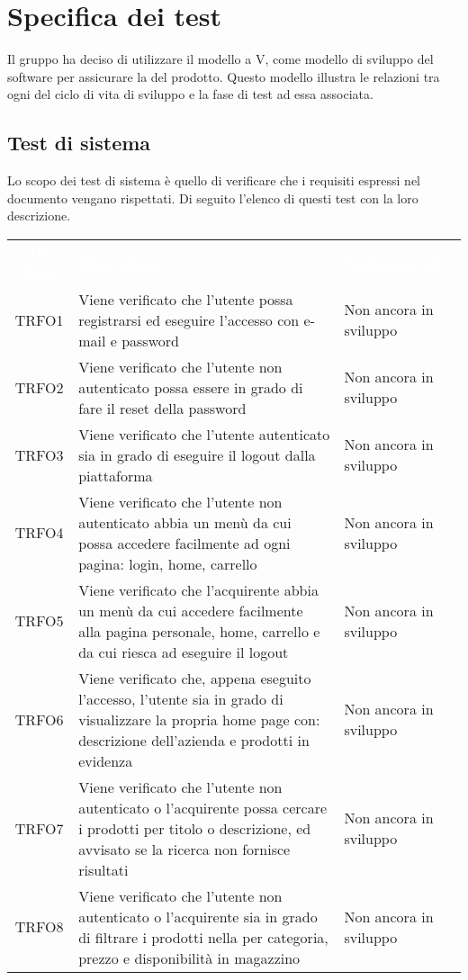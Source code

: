 \section{Specifica dei test}
\label{specificatest}
Il gruppo ha deciso di utilizzare il modello a V, come modello di sviluppo del software per assicurare la  del prodotto. Questo modello illustra le relazioni tra ogni  del ciclo di vita di sviluppo e la fase di test ad essa associata.
\subsection{Test di sistema}
Lo scopo dei test di sistema è quello di verificare che i requisiti espressi nel documento \AdR{} vengano rispettati. Di seguito l'elenco di questi test con la loro descrizione.
\begin{longtable}{|c| C{10cm} |C{3cm}|} 
	\textcolor{white}{\textbf{ID Test}}&
	\textcolor{white}{\textbf{Descrizione}}&
	\textcolor{white}{\textbf{Implementato}}\\
	TRFO1 & Viene verificato che l'utente possa registrarsi ed eseguire l'accesso con e-mail e password & Non ancora in sviluppo\\ \hline
	TRFO2 & Viene verificato che l'utente non autenticato possa essere in grado di fare il reset della password & Non ancora in sviluppo\\ \hline
	TRFO3 & Viene verificato che l'utente autenticato sia in grado di eseguire il logout dalla piattaforma & Non ancora in sviluppo\\ \hline
	TRFO4 & Viene verificato che l'utente non autenticato abbia un menù da cui possa accedere facilmente ad ogni pagina: login, home, carrello & Non ancora in sviluppo\\ \hline
	TRFO5 & Viene verificato che l'acquirente abbia un menù da cui accedere facilmente alla pagina personale, home, carrello e da cui riesca ad eseguire il logout & Non ancora in sviluppo\\ \hline
	TRFO6 & Viene verificato che, appena eseguito l'accesso, l'utente sia in grado di visualizzare la propria home page con: descrizione dell'azienda e prodotti in evidenza & Non ancora in sviluppo\\ \hline
	TRFO7 & Viene verificato che l'utente non autenticato o l'acquirente possa cercare i prodotti per titolo o descrizione, ed avvisato se la ricerca non fornisce risultati & Non ancora in sviluppo\\ \hline
	TRFO8 & Viene verificato che l'utente non autenticato o l'acquirente sia in grado di filtrare i prodotti nella  per categoria, prezzo e disponibilità in magazzino & Non ancora in sviluppo\\ \hline

\end{longtable}
